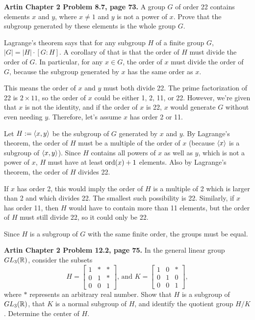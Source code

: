 \documentclass{article}
\begin{document}
\bigskip
\begin{prob}
    \textbf{Artin Chapter 2 Problem 8.7, page 73.} A group $G$ of order 22 contains elements $x$ and $y$, where $x \neq 1$ and $y$ is not a power of $x$. Prove that the subgroup generated by these elements is the whole group $G$.
\end{prob}
Lagrange's theorem says that for any subgroup $H$ of a finite group $G$, $|G|=|H| \cdot [G:H]$. A corollary of that is that the order of $H$ must divide the order of $G$. In particular, for any $x \in G$, the order of $x$ must divide the order of $G$, because the subgroup generated by $x$ has the same order as $x$.
\par
This means the order of $x$ and $y$ must both divide 22. The prime factorization of 22 is $2 \times 11$, so the order of $x$ could be either 1, 2, 11, or 22. However, we're given that $x$ is not the identity, and if the order of $x$ is 22, $x$ would generate $G$ without even needing $y$. Therefore, let's assume $x$ has order 2 or 11.
\par
Let $H := \left\langle x,y \right\rangle$ be the subgroup of $G$ generated by $x$ and $y$. By Lagrange's theorem, the order of $H$ must be a multiple of the order of $x$ (because $\left\langle x \right\rangle$ is a subgroup of $\left\langle x,y \right\rangle$). Since $H$ contains all powers of $x$ as well as $y$, which is not a power of $x$, $H$ must have at least $\operatorname{ord}(x)+1$ elements. Also by Lagrange's theorem, the order of $H$ divides 22.
\par
If $x$ has order 2, this would imply the order of $H$ is a multiple of 2 which is larger than 2 and which divides 22. The smallest such possibility is 22. Similarly, if $x$ has order 11, then $H$ would have to contain more than 11 elements, but the order of $H$ must still divide 22, so it could only be 22.
\par
Since $H$ is a subgroup of $G$ with the same finite order, the groups must be equal.

\bigskip
\begin{prob}
    \textbf{Artin Chapter 2 Problem 12.2, page 75.} In the general linear group $GL_3(\mathbb{R})$, consider the subsets
    \[ H=\begin{bmatrix}
        1 & * & * \\
        0 & 1 & * \\
        0 & 0 & 1
    \end{bmatrix}\text{, and } K = \begin{bmatrix}
        1 & 0 & * \\
        0 & 1 & 0 \\
        0 & 0 & 1
    \end{bmatrix}, \]
    where $*$ represents an arbitrary real number. Show that $H$ is a subgroup of $GL_3(\mathbb{R})$, that $K$ is a normal subgroup of $H$, and identify the quotient group $H/K$. Determine the center of $H$.
\end{prob}
\end{document}
